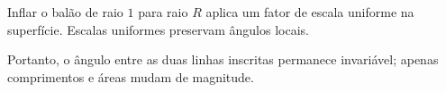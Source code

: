 Inflar o balão de raio $1$ para raio $R$ aplica um fator de escala uniforme na superfície. Escalas uniformes preservam ângulos locais.

Portanto, o ângulo entre as duas linhas inscritas permanece invariável; apenas comprimentos e áreas mudam de magnitude.

